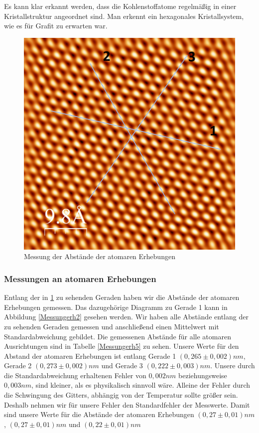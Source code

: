 \documentclass[10pt,a4paper]{article}
\begin{document}
Es kann klar erkannt werden, dass die Kohlenstoffatome regelmäßig in einer Kristallstruktur angeordnet sind. Man erkennt ein hexagonales Kristallsystem, wie es für Grafit zu erwarten war.

\begin{figure}[h]
	\centering

	\includegraphics[scale = 0.4]{Aufnahme_Ebene_doppelte_fourier2.png}

	\caption{Messung der Abstände der atomaren Erhebungen}
	\label{Messungerh1}
\end{figure}

\subsubsection{Messungen an atomaren Erhebungen} \label{kapitolo}

Entlang der in \ref{Messungerh1} zu sehenden Geraden haben wir die Abstände der atomaren Erhebungen gemessen. Das dazugehörige Diagramm zu Gerade 1 kann in Abbildung \ref{Messungerh2} gesehen werden. Wir haben alle Abstände entlang der zu sehenden Geraden gemessen und anschließend einen Mittelwert mit Standardabweichung gebildet. Die gemessenen Abstände für alle atomaren Ausrichtungen sind in Tabelle \ref{Messungerh5} zu sehen. Unsere Werte für den Abstand der atomaren Erhebungen ist entlang Gerade 1 $(0,265 \pm 0,002) nm$, Gerade 2 $(0,273 \pm 0,002) nm$ und Gerade 3 $(0,222 \pm 0,003) nm$. Unsere durch die Standardabweichung erhaltenen Fehler von $0,002 nm$ beziehungsweise $0,003 nm$, sind kleiner, als es physikalisch sinnvoll wäre. Alleine der Fehler durch die Schwingung des Gitters, abhängig von der Temperatur sollte größer sein. Deshalb nehmen wir für unsere Fehler den Standardfehler der Messwerte. Damit sind unsere Werte für die Abstände der atomaren Erhebungen $(0,27 \pm 0,01) nm$, $(0,27 \pm 0,01) nm$ und $(0,22 \pm 0,01) nm$
\end{document}
